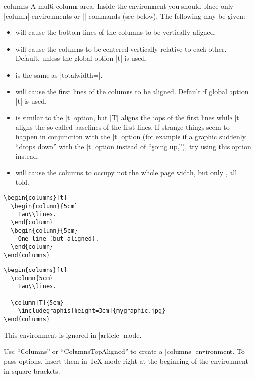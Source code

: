 \begin{environment}{{columns}}
  A multi-column area. Inside the environment you should place only
  |column| environments or |\column| commands (see below). The
  following  may be given:
  \begin{itemize}
  \item
     will cause the bottom lines of the columns to be
    vertically aligned.
  \item
     will cause the columns to be centered vertically
    relative to each other. Default, unless the global option
    |t| is used.
  \item
     is the same as |totalwidth=\textwidth|.
  \item
     will cause the first lines of the columns to be
    aligned. Default if global option |t| is used.
  \item
     is similar to the |t| option, but |T| aligns the
    tops of the first lines while |t| aligns the so-called baselines
    of the first lines. If strange things seem to happen in
    conjunction with the |t| option (for example if a graphic suddenly
    ``drops down'' with the |t| option instead of ``going up,''), try
    using this option instead.
  \item
     will cause the columns to occupy
    not the whole page width, but only , all told.
  \end{itemize}

  \example
\begin{verbatim}
\begin{columns}[t]
  \begin{column}{5cm}
    Two\\lines.
  \end{column}
  \begin{column}{5cm}
    One line (but aligned).
  \end{column}
\end{columns}
\end{verbatim}

  \example
\begin{verbatim}
\begin{columns}[t]
  \column{5cm}
    Two\\lines.

  \column[T]{5cm}
    \includegraphis[height=3cm]{mygraphic.jpg}
\end{columns}
\end{verbatim}

  \articlenote
  This environment is ignored in |article| mode.

  \lyxnote
  Use ``Columns'' or ``ColumnsTopAligned'' to create a |columns|
  environment. To pass options, insert them in \TeX-mode right at the
  beginning of the environment in square brackets.
\end{environment}

